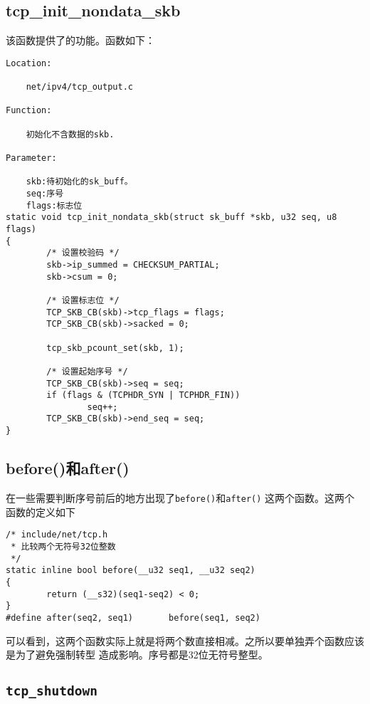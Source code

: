 \subsection{tcp\_init\_nondata\_skb}
该函数提供了的功能。函数如下：


\begin{verbatim}
Location:

	net/ipv4/tcp_output.c
	
Function:

	初始化不含数据的skb.

Parameter:

	skb:待初始化的sk_buff。
  	seq:序号
	flags:标志位
static void tcp_init_nondata_skb(struct sk_buff *skb, u32 seq, u8 flags)
{
        /* 设置校验码 */
        skb->ip_summed = CHECKSUM_PARTIAL;
        skb->csum = 0;

        /* 设置标志位 */
        TCP_SKB_CB(skb)->tcp_flags = flags;
        TCP_SKB_CB(skb)->sacked = 0;

        tcp_skb_pcount_set(skb, 1);

        /* 设置起始序号 */
        TCP_SKB_CB(skb)->seq = seq;
        if (flags & (TCPHDR_SYN | TCPHDR_FIN))
                seq++;
        TCP_SKB_CB(skb)->end_seq = seq;
}
\end{verbatim}

\subsection{before()和after()}
在一些需要判断序号前后的地方出现了\texttt{before()}和\texttt{after()}
这两个函数。这两个函数的定义如下
\begin{verbatim}
/* include/net/tcp.h
 * 比较两个无符号32位整数
 */
static inline bool before(__u32 seq1, __u32 seq2)
{
        return (__s32)(seq1-seq2) < 0;
}
#define after(seq2, seq1)       before(seq1, seq2)
\end{verbatim}
可以看到，这两个函数实际上就是将两个数直接相减。之所以要单独弄个函数应该是为了避免强制转型
造成影响。序号都是32位无符号整型。

	\subsection{\texttt{tcp_shutdown}}

